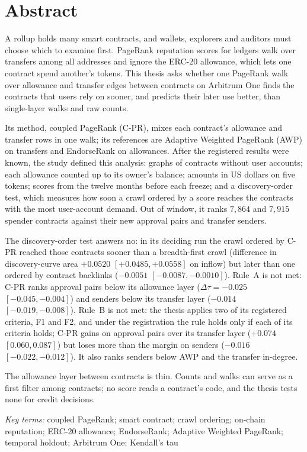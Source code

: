 
\chapter*{Abstract}

\label{ch:abstract}

A rollup holds many smart contracts, and wallets, explorers and auditors must choose which to examine first. PageRank reputation scores for ledgers walk over transfers among all addresses and ignore the ERC-20 allowance, which lets one contract spend another's tokens. This thesis asks whether one PageRank walk over allowance and transfer edges between contracts on Arbitrum One finds the contracts that users rely on sooner, and predicts their later use better, than single-layer walks and raw counts.

Its method, coupled PageRank (\mbox{C-PR}), mixes each contract's allowance and transfer rows in one walk; its references are Adaptive Weighted PageRank (AWP) on transfers and EndorseRank on allowances. After the registered results were known, the study defined this analysis: graphs of contracts without user accounts; each allowance counted up to its owner's balance; amounts in US dollars on five tokens; scores from the twelve months before each freeze; and a discovery-order test, which measures how soon a crawl ordered by a score reaches the contracts with the most user-account demand. Out of window, it ranks $7{,}864$ and $7{,}915$ spender contracts against their new approval pairs and transfer senders.

The discovery-order test answers no: in its deciding run the crawl ordered by \mbox{C-PR} reached those contracts sooner than a breadth-first crawl (difference in discovery-curve area $+0.0520$ $[+0.0485,+0.0558]$ on inflow) but later than one ordered by contract backlinks ($-0.0051$ $[-0.0087,-0.0010]$). Rule~A is not met: \mbox{C-PR} ranks approval pairs below its allowance layer ($\Delta\tau=-0.025$ $[-0.045,-0.004]$) and senders below its transfer layer ($-0.014$ $[-0.019,-0.008]$). Rule~B is not met: the thesis applies two of its registered criteria, F1 and F2, and under the registration the rule holds only if each of its criteria holds; \mbox{C-PR} gains on approval pairs over its transfer layer ($+0.074$ $[0.060,0.087]$) but loses more than the margin on senders ($-0.016$ $[-0.022,-0.012]$). It also ranks senders below AWP and the transfer in-degree.

The allowance layer between contracts is thin. Counts and walks can serve as a first filter among contracts; no score reads a contract's code, and the thesis tests none for credit decisions.

\emph{Key terms:} coupled PageRank; smart contract; crawl ordering; on-chain reputation; ERC-20 allowance; EndorseRank; Adaptive Weighted PageRank; temporal holdout; Arbitrum One; Kendall's tau

